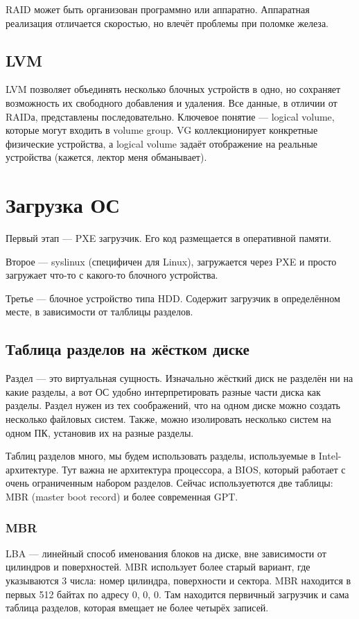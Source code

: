 \documentclass[main]{subfiles}
\begin{document}
RAID может быть организован программно или аппаратно. Аппаратная реализация
отличается скоростью, но влечёт проблемы при поломке железа.

\section{LVM}
LVM позволяет объединять несколько блочных устройств в одно, но сохраняет
возможность их свободного добавления и удаления. Все данные, в отличии
от RAIDа, представлены последовательно.
Ключевое понятие --- logical volume, которые могут входить в volume group.
VG коллекционирует конкретные физические устройства, а logical volume
задаёт отображение на реальные устройства (кажется, лектор меня обманывает).

\chapter{Загрузка ОС}
Первый этап --- PXE загрузчик. Его код размещается в оперативной памяти.

Второе --- syslinux (специфичен для Linux), загружается через
PXE и просто загружает что-то с какого-то блочного устройства.

Третье --- блочное устройство типа HDD. Содержит загрузчик в определённом
месте, в зависимости от талблицы разделов.

\section{Таблица разделов на жёстком диске}
Раздел --- это виртуальная сущность. Изначально жёсткий диск не разделён
ни на какие разделы, а вот ОС удобно интерпретировать разные части диска как
разделы. Раздел нужен из тех соображений, что на одном диске можно создать
несколько файловых систем. Также, можно изолировать несколько систем на одном
ПК, установив их на разные разделы.

Таблиц разделов много, мы будем использовать разделы, используемые в Intel-архитектуре.
Тут важна не архитектура процессора, а BIOS, который работает с очень ограниченным
набором разделов. Сейчас используетются две таблицы:
MBR (master boot record) и более современная GPT.

\subsection{MBR}
LBA --- линейный способ именования блоков на диске,
вне зависимости от цилиндров и поверхностей. MBR использует более старый
вариант, где указываются 3 числа: номер цилиндра, поверхности и сектора.
MBR находится в первых 512 байтах по адресу 0, 0, 0. Там находится первичный
загрузчик и сама таблица разделов, которая вмещает не более четырёх записей.
\end{document}
